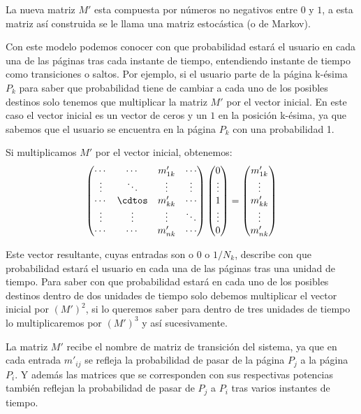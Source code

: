 \documentclass[size=a4, parskip=half, titlepage=false, toc=flat, toc=bib, 12pt, twoside]{scrartcl}
\theoremstyle{theorem-style}
\theoremstyle{definition-style}
\theoremstyle{remark-style}
\theoremstyle{example-style}
\theoremstyle{definition-style}
\theoremstyle{remark-style}
\begin{document}
La nueva matriz $M'$ esta compuesta por números no negativos entre $0$ y $1$, a esta matriz así construida se le llama una matriz estocástica (o de Markov).

Con este modelo podemos conocer con que probabilidad estará el usuario en cada una de las páginas tras cada instante de tiempo, entendiendo instante de tiempo como transiciones o saltos. Por ejemplo, si el usuario parte de la página k-ésima $P_k$ para saber que probabilidad tiene de cambiar a cada uno de los posibles destinos solo tenemos que multiplicar la matriz $M'$ por el vector inicial. En este caso el vector inicial es un vector de ceros y un $1$ en la posición k-ésima, ya que sabemos que el usuario se encuentra en la página $P_k$ con una probabilidad 1.

Si multiplicamos $M'$ por el vector inicial, obtenemos:
$$\begin{pmatrix}
\cdots & \cdots & m'_{1k} & \cdots \\
\vdots & \ddots & \vdots & \vdots \\
\cdots & \cdtos & m'_{kk} & \cdots \\
\vdots & \vdots & \vdots & \ddots \\
\cdots & \cdots & m'_{nk} & \cdots \end{pmatrix} \begin{pmatrix}
0 \\
\vdots \\
1 \\
\vdots \\
0 \end{pmatrix} = \begin{pmatrix}
m'_{1k}\\
\vdots \\
m'_{kk} \\
\vdots \\
m'_{nk} \end{pmatrix}$$

Este vector resultante, cuyas entradas son o $0$ o $1/N_k$, describe con que probabilidad estará el usuario en cada una de las páginas tras una unidad de tiempo. Para saber con que probabilidad estará en cada uno de los posibles destinos dentro de dos unidades de tiempo solo debemos multiplicar el vector inicial por $(M')^2$, si lo queremos saber para dentro de tres unidades de tiempo lo multiplicaremos por $(M')^3$ y así sucesivamente.

La matriz $M'$ recibe el nombre de matriz de transición del sistema, ya que en cada entrada $m'_{ij}$ se refleja la probabilidad de pasar de la página $P_j$ a la página $P_i$. Y además las matrices que se corresponden con sus respectivas potencias también reflejan la probabilidad de pasar de $P_j$ a $P_i$ tras varios instantes de tiempo.
\end{document}

